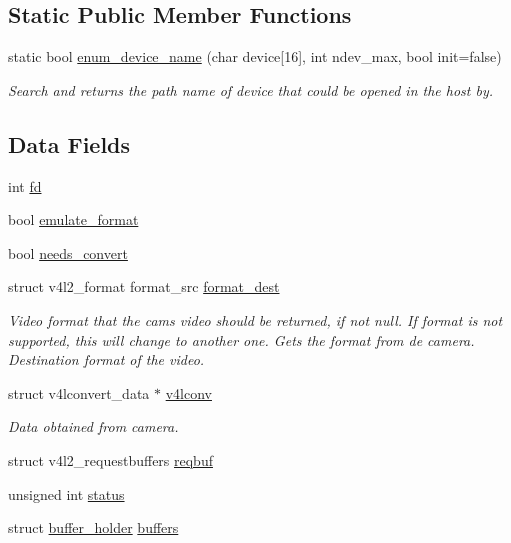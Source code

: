 \subsection*{Static Public Member Functions}
\begin{DoxyCompactItemize}
\item 
static bool \hyperlink{classv4lcap_a4949a041b3096de1d98336eb8921b7c7}{enum\+\_\+device\+\_\+name} (char device\mbox{[}16\mbox{]}, int ndev\+\_\+max, bool init=false)
\begin{DoxyCompactList}\small\item\em Search and returns the path name of device that could be opened in the host by. \end{DoxyCompactList}\end{DoxyCompactItemize}
\subsection*{Data Fields}
\begin{DoxyCompactItemize}
\item 
int \hyperlink{classv4lcap_a38109593bde997dad13b3a461569573d}{fd}
\item 
bool \hyperlink{classv4lcap_a21b4c152f56ecc309a490cb8ab4ce117}{emulate\+\_\+format}
\item 
bool \hyperlink{classv4lcap_acd02d2da6ff03a44a2e155af449144e4}{needs\+\_\+convert}
\item 
struct v4l2\+\_\+format format\+\_\+src \hyperlink{classv4lcap_a51d51cae7bdc2fe6aa5bec4ddbeb6c31}{format\+\_\+dest}
\begin{DoxyCompactList}\small\item\em Video format that the cam\textquotesingle{}s video should be returned, if not null. If format is not supported, this will change to another one.  Gets the format from de camera.  Destination format of the video. \end{DoxyCompactList}\item 
struct v4lconvert\+\_\+data $\ast$ \hyperlink{classv4lcap_a5e57bbf84383d7b42d0cc9d1e7e03abb}{v4lconv}
\begin{DoxyCompactList}\small\item\em Data obtained from camera. \end{DoxyCompactList}\item 
struct v4l2\+\_\+requestbuffers \hyperlink{classv4lcap_a4b98d5a7e7859a8e234d54649ea9251e}{reqbuf}
\item 
unsigned int \hyperlink{classv4lcap_ae90192b024d952b464408e0ffd95d90a}{status}
\item 
struct \hyperlink{structv4lcap_1_1buffer__holder}{buffer\+\_\+holder} \hyperlink{classv4lcap_a046084072d2279bb204ed93cd2692700}{buffers}
\end{DoxyCompactItemize}


